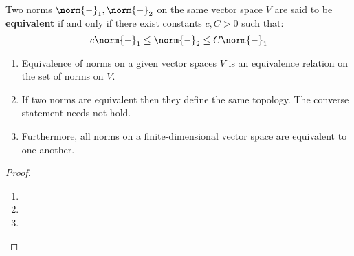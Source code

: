         \begin{proposition} \label{prop: norm_equivalence}
            Two norms $\norm{-}_1, \norm{-}_2$ on the same vector space $V$ are said to be \textbf{equivalent} if and only if there exist constants $c, C > 0$ such that:
                $$c \norm{-}_1 \leq \norm{-}_2 \leq C \norm{-}_1$$
            \begin{enumerate}
                \item Equivalence of norms on a given vector spaces $V$ is an equivalence relation on the set of norms on $V$.
                \item If two norms are equivalent then they define the same topology. The converse statement needs not hold.
                \item Furthermore, all norms on a finite-dimensional vector space are equivalent to one another.
            \end{enumerate}
        \end{proposition}
            \begin{proof}
                \begin{enumerate}
                    \item 
                    \item 
                    \item 
                \end{enumerate}
            \end{proof}
            
